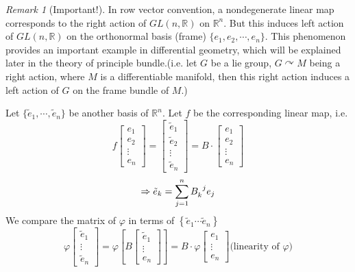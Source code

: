 \documentclass[UTF8,oneside,11pt]{book}
\theoremstyle{plain}\newtheorem{thm}{Theorem}
\theoremstyle{definition}\newtheorem{defn}[thm]{Definition}
\theoremstyle{plain}\newtheorem{axiom}[thm]{Axiom}
\theoremstyle{plain}\newtheorem{coro}[thm]{Corollary}
\theoremstyle{plain}\newtheorem{lemma}[thm]{Lemma}
\theoremstyle{plain}\newtheorem{prop}[thm]{Proposition}
\theoremstyle{plain}\newtheorem{conj}[thm]{Conjecture}
\theoremstyle{plain}\newtheorem{ques}[thm]{Problem}
\theoremstyle{plain}\newtheorem{const}[thm]{Construction}
\theoremstyle{remark}\newtheorem{notation}[thm]{Notation}
\theoremstyle{plain}\newtheorem*{app}{Application}
\theoremstyle{plain}\newtheorem*{exam}{Example}
\theoremstyle{plain}\newtheorem*{exer}{Exercise}
\theoremstyle{remark}\newtheorem*{remark}{Remark}
\theoremstyle{remark}\newtheorem*{note}{\small{Note}}
\numberwithin{equation}{section}
\numberwithin{thm}{section}
\begin{document}
\begin{remark}[Important!]
    In row vector convention, a nondegenerate linear map corresponds to the right action of $GL(n,\mathbb{R})$ on $\mathbb{R}^n$. But this induces left action of $GL(n,\mathbb{R})$ on the orthonormal basis (frame) $\{e_1,e_2,\cdots,e_n\}$. This phenomenon provides an important example in differential geometry, which will be explained later in the theory of principle bundle.(i.e. let $G$ be a lie group, $G\curvearrowright M$ being a right action, where $M$ is a differentiable manifold, then this right action induces a left action of $G$ on the frame bundle of $M$.)
 \end{remark}
 \par 
 Let $\{\tilde{e}_1,\cdots,\tilde{e}_n\}$ be another basis of $\mathbb{R}^n$. Let $f$ be the corresponding linear map, i.e.
 \[f\begin{bmatrix}
    e_1\\
    e_2\\
    \vdots\\
    e_n
\end{bmatrix}=\begin{bmatrix}
    \tilde{e}_1\\
    \tilde{e}_2\\
    \vdots\\
    \tilde{e}_n
\end{bmatrix}=B \cdot \begin{bmatrix}
    e_1\\
    e_2\\
    \vdots\\
    e_n
\end{bmatrix}\]
\[\Rightarrow \tilde{e}_k=\sum_{j=1}^n B\indices{_k^j}e_j\]
We compare the matrix of $\varphi$ in terms of $\left\{\tilde{e}_1 \cdots \tilde{e}_n\right\}$
$$\varphi\left[\begin{array}{c}\tilde{e}_1 \\ \vdots \\ \tilde{e}_n\end{array}\right]=\varphi\left[B\left[\begin{array}{c}\tilde{e}_1 \\ \vdots \\ e_n\end{array}\right]\right]=B \cdot \varphi\left[\begin{array}{c}e_1 \\ \vdots \\ e_n\end{array}\right]\text{(linearity of }\varphi\text{)}$$
\end{document}
